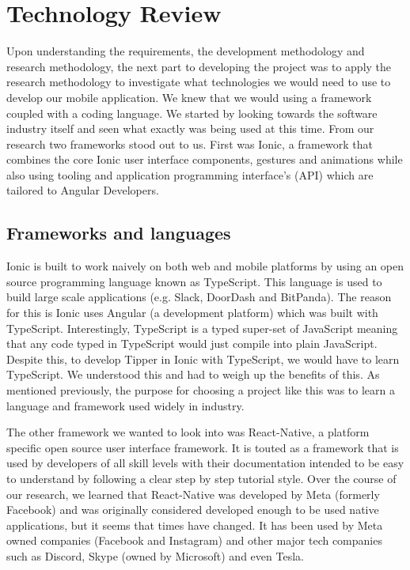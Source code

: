 \chapter{Technology Review}
Upon understanding the requirements, the development methodology and research methodology, the next part to developing the project was to apply the research methodology to investigate what technologies we would need to use to develop our mobile application. We knew that we would using a framework coupled with a coding language. We started by looking towards the software industry itself and seen what exactly was being used at this time. From our research two frameworks stood out to us. First was Ionic, a framework that combines the core Ionic user interface components, gestures and animations while also using tooling and application programming interface's (API) which are tailored to Angular Developers. 

\section{Frameworks and languages}
Ionic\cite{Ionic} is built to work naively on both web and mobile platforms by using an open source programming language known as TypeScript. This language is used to build large scale applications (e.g. Slack, DoorDash and BitPanda). The reason for this is Ionic uses Angular (a development platform) which was built with TypeScript. Interestingly, TypeScript is a typed super-set of JavaScript meaning that any code typed in TypeScript would just compile into plain JavaScript\cite{tsIntoJS}. Despite this, to develop Tipper in Ionic with TypeScript, we would have to learn TypeScript. We understood this and had to weigh up the benefits of this. As mentioned previously, the purpose for choosing a project like this was to learn a language and framework used widely in industry. 

The other framework we wanted to look into was React-Native, a platform specific open source user interface framework. It is touted as a framework that is used by developers of all skill levels with their documentation intended to be easy to understand by following a clear step by step tutorial style. Over the course of our research, we learned that React-Native was developed by Meta (formerly Facebook)\cite{reactnative} and was originally considered developed enough to be used native applications, but it seems that times have changed. It has been used by Meta owned companies (Facebook and Instagram) and other major tech companies such as Discord, Skype (owned by Microsoft) and even Tesla\cite{reactnative}.


